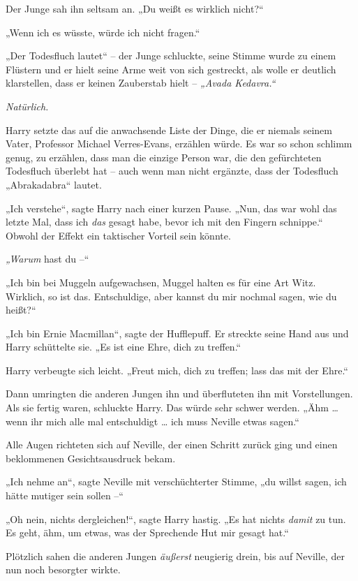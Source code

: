 {Der Junge sah ihn seltsam an. „Du weißt es wirklich nicht?“

„Wenn ich es wüsste, würde ich nicht fragen.“

„Der Todesfluch lautet“ -- der Junge schluckte, seine Stimme wurde zu einem Flüstern und er hielt seine Arme weit von sich gestreckt, als wolle er deutlich klarstellen, dass er keinen Zauberstab hielt -- \emph{„Avada Kedavra.“}

\emph{Natürlich.}

Harry setzte das auf die anwachsende Liste der Dinge, die er niemals seinem Vater, Professor Michael Verres-Evans, erzählen würde. Es war so schon schlimm genug, zu erzählen, dass man die einzige Person war, die den gefürchteten Todesfluch überlebt hat -- auch wenn man nicht ergänzte, dass der Todesfluch „Abrakadabra“ lautet.

„Ich verstehe“, sagte Harry nach einer kurzen Pause. „Nun, das war wohl das letzte Mal, dass ich \emph{das} gesagt habe, bevor ich mit den Fingern schnippe.“ Obwohl der Effekt ein taktischer Vorteil sein könnte.

\emph{„Warum} hast du --“

„Ich bin bei Muggeln aufgewachsen, Muggel halten es für eine Art Witz. Wirklich, so ist das. Entschuldige, aber kannst du mir nochmal sagen, wie du heißt?“

„Ich bin Ernie Macmillan“, sagte der Hufflepuff. Er streckte seine Hand aus und Harry schüttelte sie. „Es ist eine Ehre, dich zu treffen.“

Harry verbeugte sich leicht. „Freut mich, dich zu treffen; lass das mit der Ehre.“

Dann umringten die anderen Jungen ihn und überfluteten ihn mit Vorstellungen. Als sie fertig waren, schluckte Harry. Das würde sehr schwer werden. „Ähm … wenn ihr mich alle mal entschuldigt … ich muss Neville etwas sagen.“

Alle Augen richteten sich auf Neville, der einen Schritt zurück ging und einen beklommenen Gesichtsausdruck bekam.

„Ich nehme an“, sagte Neville mit verschüchterter Stimme, „du willst sagen, ich hätte mutiger sein sollen --“

„Oh nein, nichts dergleichen!“, sagte Harry hastig. „Es hat nichts \emph{damit} zu tun. Es geht, ähm, um etwas, was der Sprechende Hut mir gesagt hat.“

Plötzlich sahen die anderen Jungen \emph{äußerst} neugierig drein, bis auf Neville, der nun noch besorgter wirkte.

}
